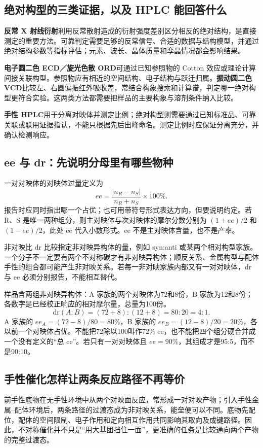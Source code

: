 \subsection{绝对构型的三类证据，以及 HPLC 能回答什么}
\textbf{反常 X 射线衍射}利用反常散射造成的衍射强度差别区分相反的绝对结构，是直接测定的重要方法。可靠判定需要足够的反常信号、合适的数据与结构模型，并通过绝对结构参数等指标评估；元素、波长、晶体质量和孪晶情况都会影响结果。

\textbf{电子圆二色 ECD／旋光色散 ORD}可通过已知参照物的 Cotton 效应或理论计算间接关联构型。参照物应有相近的空间结构、电子结构与跃迁归属。\textbf{振动圆二色 VCD}比较左、右圆偏振红外吸收差，常结合构象搜索和计算谱，判定哪一绝对构型更符合实验。这两类方法都需要把样品的主要构象与溶剂条件纳入比较。

\textbf{手性 HPLC}用于分离对映体并测定比例；绝对构型则需要通过已知标准品、可靠关联或联用证据指认，不能只根据先后出峰命名。测定比例时应保证分离充分，并确认检测响应。

\subsection{ee 与 dr：先说明分母里有哪些物种}
一对对映体的对映体过量定义为
\[
 ee=\frac{|n_R-n_S|}{n_R+n_S}\times100\%.
\]
报告时应同时指出哪一个占优；也可用带符号形式表达方向，但要说明约定。若 R、S 是唯一两种组分，则主对映体与次对映体的摩尔分数分别为 $(1+ee)/2$ 和 $(1-ee)/2$，此处 ee 代入小数形式。ee 不是主对映体含量，也不是产率。

非对映比 dr 比较指定非对映异构体的量，例如 syn:anti 或某两个相对构型家族。一个分子不一定要有两个不对称碳才有非对映异构体；顺反关系、金属构型与配体手性的组合都可能产生非对映关系。若每一非对映家族内部又有一对对映体，dr 与 ee 必须分别报告，不能相互替代。

\begin{worked}
样品含两组非对映异构体：A 家族的两个对映体为72和8份，B 家族为12和8份；各数字是已经校正响应的相对摩尔量，总量为100份。
\[
 \mathrm{dr}(A:B)=(72+8):(12+8)=80:20=4:1.
\]
A 家族的 $ee_A=(72-8)/80=80\%$，B 家族的 $ee_B=(12-8)/20=20\%$，各以前一个对映体占优。不能把72除以100叫作72\% ee，也不能把四个组分硬合并成一个没有定义的“总 ee”。若只有一对对映体且 $ee=90\%$，其组成才是95:5，而不是90:10。
\end{worked}

\subsection{手性催化怎样让两条反应路径不再等价}
前手性底物在无手性环境中从两个对映面反应，常形成一对对映产物；引入手性金属--配体环境后，两条路径的过渡态成为非对映关系，能垒便可以不同。底物先配位，配体的空间限制、电子作用和定向相互作用共同影响其取向及成键路径。因此，不对称催化并不只是“用大基团挡住一面”，更准确的任务是比较通向两个产物的完整过渡态。

